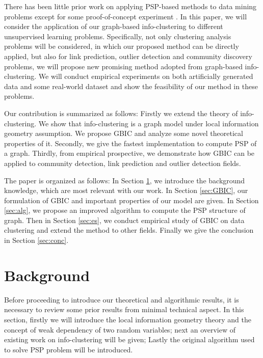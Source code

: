 There has been little prior work on applying PSP-based methods to data mining problems except for some proof-of-concept experiment \citep{mac}. In this paper, we will consider the application
of our graph-based info-clustering to different unsupervised learning problems. Specifically, not only clustering analysis problems will be considered, in which our proposed method can be directly applied, but also for link prediction, outlier detection and community discovery problems, we will propose new promising
method adopted from graph-based info-clustering. We will conduct empirical experiments on both artificially generated data and some real-world dataset and show the feasibility of our method in
these problems.

Our contribution is summarized as follows: Firstly we extend the theory of info-clustering. We show that info-clustering is a graph model under local information geometry assumption. We propose GBIC and analyze some novel theoretical properties of it. Secondly, we give the fastest implementation to compute PSP of a graph. Thirdly, from empirical prospective, we demonstrate how GBIC can be applied to community detection, link prediction and outlier detection fields.
 
The paper is organized as follows: In Section \ref{sec:bk}, we introduce the background knowledge, which are most relevant with our work. In Section \ref{sec:GBIC}, our formulation of GBIC and important properties of our model are given. In Section \ref{sec:alg}, we propose an improved algorithm to compute the PSP structure of graph. Then in Section \ref{sec:es}, we conduct empirical study of GBIC on data clustering and extend the method to other fields. Finally we give the conclusion in Section \ref{sec:conc}.


\section{Background}\label{sec:bk}
Before proceeding to introduce our theoretical and algorithmic results, it is necessary to review some prior results from minimal technical aspect. In this section, firstly we will introduce
the local information geometry theory and the concept of weak dependency of two random variables;
next an overview of existing work on info-clustering will be given;
Lastly the original algorithm used to solve PSP problem will be introduced.

